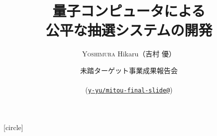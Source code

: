 \setmonofont[Ligatures=TeX]{CMU Typewriter Text}







\title[量子コンピュータによる公平な抽選システムの開発]{%
  {\bfseries\rmfamily\mcfamily\huge\scshape
    量子コンピュータによる \\
    公平な抽選システムの開発%
  }
}
\author[Yoshimura Hikaru]{%
  \textsc{Yoshimura} Hikaru（吉村 優）
}
\date[February 8, 2020]{%
  未踏ターゲット事業成果報告会 \\
   \\
  {\scriptsize (\href{https://github.com/y-yu/mitou-final-slide}{\texttt{y-yu/mitou-final-slide@\GITAbrHash}})}%
}

[circle]

\newcommand\ballcircle[1]{%
  {%
    \usebeamercolor{enumerate item}%
    \tikzset{beameritem/.style={circle,inner sep=0,minimum size=2ex,text=enumerate item.bg,fill=enumerate item.fg,font=\footnotesize}}%
    \tikz[baseline=(n.base)]\node(n)[beameritem]{#1};%
  }
}
\newcommand\ballref[1]{%
  \ballcircle{\ref{#1}}
}

\newcommand\ce[1]{%
  \coloremoji{#1}
}

\newenvironment{notes}
  {%
    \begin{xlrbox}{NotesBox}
    \begin{minipage}{.95\textwidth}
    \small\rmfamily\mcfamily
    \begin{itemize}
    \setlength{\itemindent}{0em}
  }{%
    \end{itemize}
    \end{minipage}
    \end{xlrbox}
    \note{\theNotesBox}}

\makeatletter
\newsavebox\temp@simple@callout@box
\newcommand{\simplecallout}[3]{%
  \sbox{\temp@simple@callout@box}{\mbox{%
    \begin{tabular}{l}
      #3%
    \end{tabular}
  }}%
  \begin{center}%
    \begin{tikzpicture}%
      \calloutquote[width=1.05\wd\temp@simple@callout@box,position={(#1.5,-0.2)},fill=#2,rounded corners]{
        #3%
      }%
    \end{tikzpicture}%
  \end{center}
}
\makeatother



